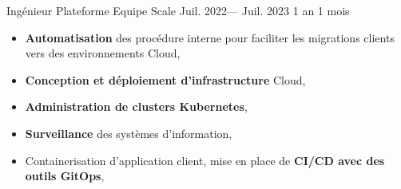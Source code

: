 \jobposition%
{Ingénieur Plateforme}%
{Equipe Scale}
{Juil. 2022--- Juil. 2023}%
{1 an 1 mois}%
{
	\begin{itemize}
		\item \textbf{Automatisation} des procédure interne pour faciliter les
		      migrations clients vers des environnements Cloud,
		\item \textbf{Conception et déploiement d'infrastructure} Cloud,
		\item \textbf{Administration de clusters Kubernetes},
		\item \textbf{Surveillance} des systèmes d'information,
		\item Containerisation d'application client, mise en place de
		      \textbf{CI/CD avec des outils GitOps},
	\end{itemize}
}
